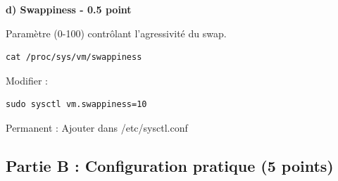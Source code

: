 \documentclass[12pt,a4paper]{article}
\begin{document}
\begin{answerbox}
\textbf{d) Swappiness - 0.5 point}

Paramètre (0-100) contrôlant l'agressivité du swap.

\begin{lstlisting}
cat /proc/sys/vm/swappiness
\end{lstlisting}

Modifier :
\begin{lstlisting}
sudo sysctl vm.swappiness=10
\end{lstlisting}

Permanent : Ajouter dans /etc/sysctl.conf
\end{answerbox}

\subsection*{Partie B : Configuration pratique (5 points)}
\end{document}
